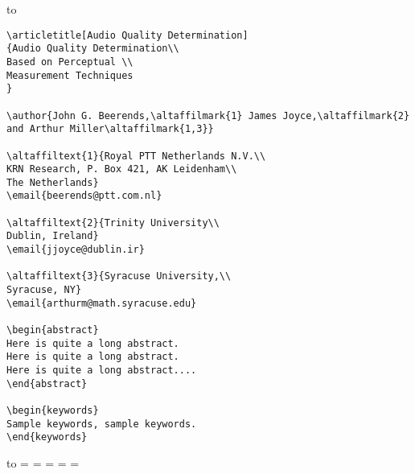 \documentclass{kapproc} %
\makeatletter
\newif\ifdotoc
\def\contentsline#1#2#3{}\@starttoc{toc}}\fi
\def\numberline#1{}
\let\savechapter\chapter
\let\savesection\section
\let\savesubsection\subsection
\newif\ifdoctitle
\def\sqbullet{\raise.2ex\hbox{\vrule width 4pt height4pt}}
\let\savelabelitemi\labelitemi
\def\labelitemi{%
{\hbox to6pt{\sqbullet\hfill}}}
\def\ysection#1{\ifdotoc
\addcontentsline{toc}{section}{\protect\numberline{x}#1}\fi
{\let\uppercase\relax
\@startsection {section}{3}{-24pt}{-36pt plus -1pt minus 
 -1pt}{1sp}{\Large\bf}*{#1}}}
\def\section{\ysection}
\def\ysubsection#1#2{{\let\uppercase\relax%
\@startsection {subsection}{2}{-12pt}{-24pt plus -1pt minus 
 -1pt}{1sp}{\large\sc}#1{#2}}}
\def\subsection{\ysubsection*}
\let\savesubsubsection\subsubsection
\def\subsubsection{\savesubsubsection*}
\def\chapter#1{\global\doctitletrue
\vbox to  9.5pc{
\hyphenpenalty=10000 %
\parindent=-36pt
\vskip12pt\vskip-\parskip
\def\\ {\vskip-\parskip}
\booktitlefont\baselineskip=30pt
#1
\vskip1sp %
\moveright-36pt\vbox{\advance\hsize by 36pt
\hrule height 1.5pt  width \hsize
}\vfill}}
\let\save@listI\@listI
\let\save@listi\@listi
\def\code{\vskip3pt
\hbox to\textwidth{\vrule width \textwidth height .6pt}
\normalsize\vskip1sp}
\def\endcode{\vskip6pt}
\def\results{\bgroup
\let\pagestyle\eatone
\let\thispagestyle\eatone
\let\newpage\relax
\hbox to\hsize{.\dotfill.}
\vskip15pt
\bgroup
\def\contentsline##1##2##3{}
\def\addcontentsline##1##2##3{}
\def\addtocontents##1##2{}
\let\@listI\save@listI
\let\@listi\save@listi \@listi
\linewidth=\savehsize
\hsize=\savehsize
\textwidth=\savetextwidth
\parindent=\saveparindent
\parskip=\saveparskip
\let\chapter\savechapter
\let\section\savesection
\let\subsection\savesubsection
\let\subsubsection\savesubsubsection
\let\labelitemi\savelabelitemi
\normalsize\par}
\def\@listI{\leftmargin\leftmargini \parsep 4\p@ plus2\p@ minus\p@
\topsep 4\p@ plus2\p@ minus4\p@
\itemsep -3pt %
}
\let\@listi\@listI
\makeatother
\begin{document}
\code
\begin{verbatim}
\articletitle[Audio Quality Determination]
{Audio Quality Determination\\
Based on Perceptual \\
Measurement Techniques
}

\author{John G. Beerends,\altaffilmark{1} James Joyce,\altaffilmark{2}
and Arthur Miller\altaffilmark{1,3}}

\altaffiltext{1}{Royal PTT Netherlands N.V.\\
KRN Research, P. Box 421, AK Leidenham\\
The Netherlands}
\email{beerends@ptt.com.nl}

\altaffiltext{2}{Trinity University\\
Dublin, Ireland}
\email{jjoyce@dublin.ir}

\altaffiltext{3}{Syracuse University,\\
Syracuse, NY}
\email{arthurm@math.syracuse.edu}

\begin{abstract}
Here is quite a long abstract.
Here is quite a long abstract.
Here is quite a long abstract....
\end{abstract}

\begin{keywords}
Sample keywords, sample keywords.
\end{keywords}

\end{verbatim}%
\endcode
\newpage
\results
{}

\author{John G. Beerends, James Joyce,
and Arthur Miller}




\begin{abstract}
Here is quite a long abstract.
Here is quite a long abstract.
Here is quite a long abstract....
\end{abstract}
\end{document}
